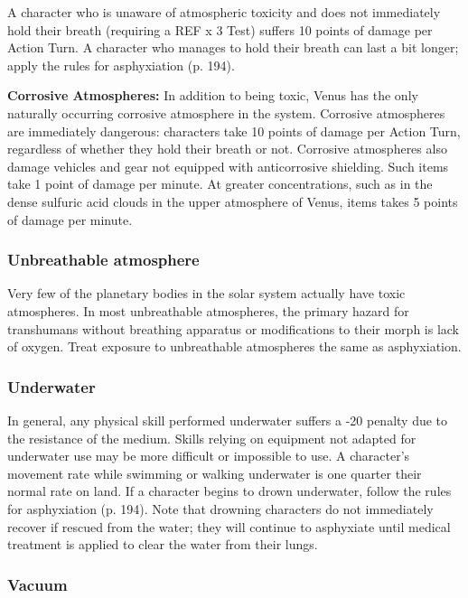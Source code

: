 A character who is unaware of atmospheric toxicity and does not immediately hold their breath (requiring a REF x 3 Test) suffers 10 points of damage per Action Turn. A character who manages to hold their breath can last a bit longer; apply the rules for asphyxiation (p. 194).

\textbf{Corrosive Atmospheres:} In addition to being toxic, Venus has the only naturally occurring corrosive atmosphere in the system. Corrosive atmospheres are immediately dangerous: characters take 10 points of damage per Action Turn, regardless of whether they hold their breath or not. Corrosive atmospheres also damage vehicles and gear not equipped with anticorrosive shielding. Such items take 1 point of damage per minute. At greater concentrations, such as in the dense sulfuric acid clouds in the upper atmosphere of Venus, items takes 5 points of damage per minute.

\subsubsection{Unbreathable atmosphere}

Very few of the planetary bodies in the solar system actually have toxic atmospheres. In most unbreathable atmospheres, the primary hazard for transhumans without breathing apparatus or modifications to their morph is lack of oxygen. Treat exposure to unbreathable atmospheres the same as asphyxiation.

\subsubsection{Underwater}

In general, any physical skill performed underwater suffers a -20 penalty due to the resistance of the medium. Skills relying on equipment not adapted for underwater use may be more difficult or impossible to use. A character’s movement rate while swimming or walking underwater is one quarter their normal rate on land. If a character begins to drown underwater, follow the rules for asphyxiation (p. 194). Note that drowning characters do not immediately recover if rescued from the water; they will continue to asphyxiate until medical treatment is applied to clear the water from their lungs.

\subsubsection{Vacuum}

